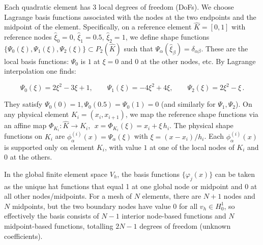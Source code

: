 \documentclass[a4paper,10pt]{article}
\begin{document}
Each quadratic element has 3 local degrees of freedom (DoFs).
We choose Lagrange basis functions associated with the nodes at the two endpoints and the midpoint of the element. 
Specifically, on a reference element $\hat K = [0,1]$ with reference nodes $\hat\xi_0=0$, $\hat\xi_1=0.5$, $\hat\xi_2=1$, we define shape functions $\{\Psi_0(\xi), \Psi_1(\xi), \Psi_2(\xi)\} \subset P_2(\hat K)$ such that $\Psi_\alpha(\hat\xi_\beta) = \delta_{\alpha\beta}$.
These are the local basis functions: $\Psi_0$ is $1$ at $\xi=0$ and $0$ at the other nodes, etc. By Lagrange interpolation one finds:

$$
\Psi_0(\xi) = 2\xi^2 - 3\xi + 1,\qquad
   \Psi_1(\xi) = -4\xi^2 + 4\xi,\qquad
   \Psi_2(\xi) = 2\xi^2 - \xi\,.
$$

They satisfy $\Psi_0(0)=1,\Psi_0(0.5)=\Psi_0(1)=0$ (and similarly for $\Psi_1,\Psi_2$). On any physical element $K_i=(x_i,x_{i+1})$, we map the reference shape functions via an affine map $\Phi_{K_i}: \hat K \to K_i$, $\;x = \Phi_{K_i}(\xi) = x_i + \xi\,h_i$. 
The physical shape functions on $K_i$ are $\phi_{\alpha}^{(i)}(x) = \Psi_\alpha(\xi)$ with $\xi = (x-x_i)/h_i$. 
Each $\phi_{\alpha}^{(i)}(x)$ is supported only on element $K_i$, with value $1$ at one of the local nodes of $K_i$ and $0$ at the others.

In the global finite element space $V_h$, the basis functions $\{\varphi_j(x)\}$ can be taken as the unique hat functions that equal 1 at one global node or midpoint and 0 at all other nodes/midpoints. 
For a mesh of $N$ elements, there are $N+1$ nodes and $N$ midpoints, but the two boundary nodes have value 0 for all $v_h \in H^1_0$, so effectively the basis consists of $N-1$ interior node-based functions and $N$ midpoint-based functions, totalling $2N-1$ degrees of freedom (unknown coefficients). 

\end{document}
